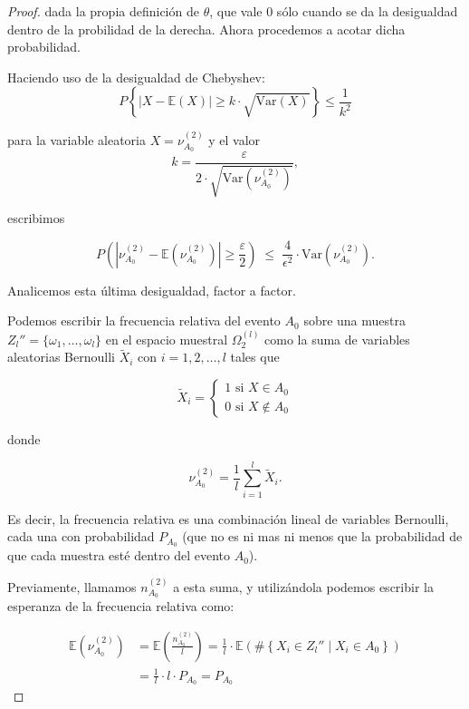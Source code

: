 \documentclass{report}
\begin{document}
\begin{proof}
dada la propia definición de $\theta$, que vale $0$ sólo cuando se da la desigualdad dentro de la probilidad de la derecha. Ahora procedemos a acotar dicha probabilidad.\newline

Haciendo uso de la desigualdad de Chebyshev: 
\[
P\left\{|X- \mathbb{E}\left(X \right)| \geq k \cdot \sqrt{\text{Var}(X)} \right\} \leq \frac{1}{k^2}
\]

para la variable aleatoria $X=\nu_{A_0}^{(2)}$ y el valor
\[
k= \frac{\varepsilon}{2\cdot\sqrt{\text{Var}\left(\nu_{A_0}^{(2)}\right)}}   ,
\]

escribimos

\begin{equation}
P\left(|\nu_{A_0}^{(2)} - \mathbb{E}\left(\nu_{A_0}^{(2)} \right)| \geq \frac{\varepsilon}{2}\right) 
\;\leq\; \frac{4}{\epsilon^2}\cdot \text{Var}\left(\nu_{A_0}^{(2)}\right). \label{Chebyshev aplicada a frecuencia relativa}
\end{equation}
\bigskip

Analicemos esta última desigualdad, factor a factor.\newline

Podemos escribir la frecuencia relativa del evento $A_0$ sobre una muestra $Z_l''=\{\omega_1,\ldots,\omega_l\}$ en el espacio muestral $\Omega^{(l)}_2$ como la suma de variables aleatorias
Bernoulli $\tilde{X}_i$ con $i=1,2,\dots,l$ tales que

\[
    \tilde{X}_i = \begin{cases} 1 \text{ si } X\in A_0\\
        0 \text{ si } X\notin A_0
\end{cases}
\]

donde

\[
    \nu_{A_0}^{(2)} = \frac{1}{l}\sum_{i=1}^l \tilde{X}_i.
\]

Es decir, la frecuencia relativa es una combinación lineal de variables Bernoulli, cada una con probabilidad $P_{A_0}$ (que no es ni mas ni
menos que la probabilidad de que cada muestra esté dentro del evento $A_0$).\newline

Previamente, llamamos $n_{A_0}^{(2)}$ a esta suma, y utilizándola podemos escribir la esperanza de la frecuencia relativa como:

\[
\begin{aligned}
    \mathbb{E}\left(\nu_{A_0}^{(2)} \right) &= \mathbb{E}\left(\frac{n_{A_0}^{(2)}}{l} \right) =  \frac{1}{l} \cdot \mathbb{E}\left( \#\left\{X_i\in Z_l''\mid X_i\in A_0\right\}\right)\\
    &= \frac{1}{l} \cdot l \cdot P_{A_0} = P_{A_0}
\end{aligned}
\]


\end{proof}
\end{document}
